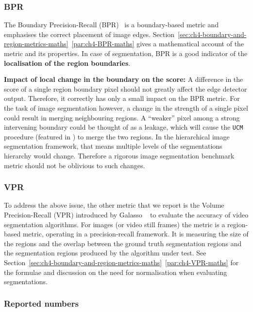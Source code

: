 \subsubsection{BPR}
\label{sec:ch5-BPR-evaluation-metric}
The Boundary Precision-Recall (BPR)~\cite{Arbelaez11} is a boundary-based metric and emphasises the correct placement of image edges. Section~\ref*{sec:ch4-boundary-and-region-metrics-maths}~\ref{par:ch4-BPR-maths} %
gives a mathematical account of %
the metric and its properties. In case of segmentation, BPR is a good indicator of the {\bf localisation of the region boundaries}.

\textbf{Impact of %
local change in the boundary on the score:} A difference in the score of a single region boundary pixel should not greatly affect the edge detector output. Therefore, it correctly has only a small impact on the BPR metric. For the task of image segmentation however, a change in the strength of a single pixel could result in merging neighbouring regions. A ``weaker'' pixel among a strong intervening boundary could be thought of as a leakage, which will cause the {\tt UCM} procedure %
(featured in ) %
to merge the two regions. In the hierarchical image segmentation framework, that means multiple levels of the segmentations hierarchy would change. Therefore a rigorous image segmentation benchmark metric should not be oblivious to such changes.

\subsubsection{VPR}
To address the above issue, the other metric that we report is the Volume Precision-Recall (VPR) introduced by Galasso \etal~\cite{Galasso13} to evaluate the accuracy of video segmentation algorithms. For images (or video still frames) the metric is a region-based metric, operating %
in %
a precision-recall framework. It is measuring the size of the regions and the overlap between the ground truth segmentation regions and the segmentation regions produced by the algorithm under test. 
See Section~\ref*{sec:ch4-boundary-and-region-metrics-maths}~\ref{par:ch4-VPR-maths} for the formulae and discussion on the need for normalisation when evaluating segmentations.

\subsubsection{Reported numbers}
